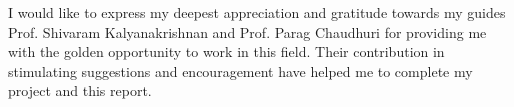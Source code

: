 \acknowledgments
I would like to express my deepest appreciation and gratitude towards my guides Prof. Shivaram Kalyanakrishnan and Prof. Parag Chaudhuri for providing me with the golden opportunity to work in this field. Their contribution in stimulating suggestions and encouragement have helped me to complete my project and this report.
\signature[Indian Institute of Technology Bombay]{\today}


